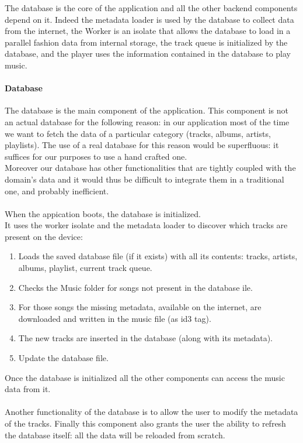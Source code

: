 \documentclass{article}
\begin{document}
The database is the core of the application and all the other backend components
depend on it. Indeed the metadata loader is used by the database to collect data
from the internet, the Worker is an isolate that allows the database to load in
a parallel fashion data from internal storage, the track queue is initialized by
the database, and the player uses the information contained in the database to
play music.

\paragraph{Database}
The database is the main component of the application. This component is not an
actual database for the following reason: in our application most of the time we
want to fetch the data of a particular category (tracks, albums, artists,
playlists). The use of a real database for this reason would be superfluous: it
suffices for our purposes to use a hand crafted one.
\\
Moreover our database has other functionalities that are tightly coupled with
the domain's data and it would thus be difficult to integrate them in a
traditional one, and probably inefficient.
\\\\
When the appication boots, the database is initialized.
\\
It uses the worker isolate and the metadata loader to discover which tracks are
present on the device:
\begin{enumerate}
    \item Loads the saved database file (if it exists) with all its contents:
    tracks, artists, albums, playlist, current track queue.
    \item Checks the Music folder for songs not present in the database ile.
    \item For those songs the missing metadata, available on the internet, are
        downloaded and written in the music file (as id3 tag). 
    \item The new tracks are inserted in the database (along with its metadata).
    \item Update the database file.
\end{enumerate}
Once the database is initialized all the other components can access the music
data from it. 
\\\\
Another functionality of the database is to allow the user to modify the
metadata of the tracks. Finally this component also grants the user the ability
to refresh the database itself: all the data will be reloaded from scratch.
\end{document}
